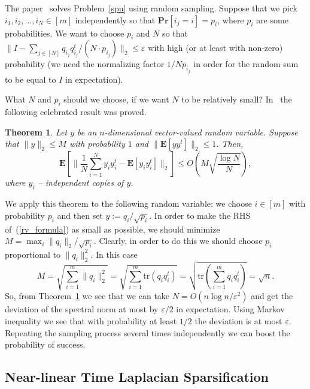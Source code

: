 \documentclass[12pt]{article}
\newcommand{\eps}{\varepsilon}
\newtheorem{theorem}{Theorem}
\begin{document}
    The paper~\cite{SS11} solves Problem~\ref{spu} using random sampling.
    Suppose that we pick $i_1, i_2, \ldots, i_N \in [m]$ independently so that
    $\mathbf{Pr}[i_j = i] = p_i$, where $p_i$ are some probabilities.
    We want to choose $p_i$ and $N$ so that
    $\|I - \sum_{j \in [N]} q_{i_j} q_{i_j}^t / (N\cdot p_{i_j})\|_2 \leq \eps$
    with high (or at least with non-zero) probability (we need the normalizing
    factor $1 / Np_{i_j}$ in order for the random sum to be equal to $I$ in expectation).

    What $N$ and $p_i$ should we choose, if we want $N$ to be relatively small?
    In~\cite{R96,RV07} the following celebrated result was proved.
    \begin{theorem}
        \label{rv_inequality}
        Let $y$ be an $n$-dimensional vector-valued random variable.
        Suppose that $\|y\|_2 \leq M$ with probability $1$ and
        $\|\mathbf{E}[yy^t]\|_2 \leq 1$. Then,
        \begin{equation}
            \label{rv_formula}
            \mathbf{E}[\|\frac{1}{N} \sum_{i = 1}^{N} y_i y_i^t - \mathbf{E}[y_i y_i^t]\|_2]
            \leq O\left(M \sqrt{\frac{\log N}{N}}\right),
        \end{equation}
        where $y_i$ -- independent copies of $y$.
    \end{theorem}

    We apply this theorem to the following random variable: we choose $i \in [m]$
    with probability $p_i$ and then set $y := q_i / \sqrt{p_i}$.
    In order to make the RHS of~(\ref{rv_formula}) as small as possible, we should
    minimize $M = \max_i \|q_i\|_2 / \sqrt{p_i}$. Clearly, in order to do this
    we should choose $p_i$ proportional to $\|q_i\|_2^2$.
    In this case
    $$
        M = \sqrt{\sum_{i=1}^m \|q_i\|_2^2} =
        \sqrt{\sum_{i=1}^m \mathrm{tr}(q_i q_i^t)} =
        \sqrt{\mathrm{tr}\left(\sum_{i=1}^m q_i q_i^t\right)} = \sqrt{n}.
    $$
    So, from Theorem~\ref{rv_inequality} we see that we can take $N = O(n \log n / \eps^2)$
    and get the deviation of the spectral norm at most by $\eps / 2$ in expectation.
    Using Markov inequality we see that with probability at least $1/2$ the deviation
    is at most $\eps$. Repeating the sampling process several times independently
    we can boost the probability of success.

    \subsection{Near-linear Time Laplacian Sparsification}
\end{document}
